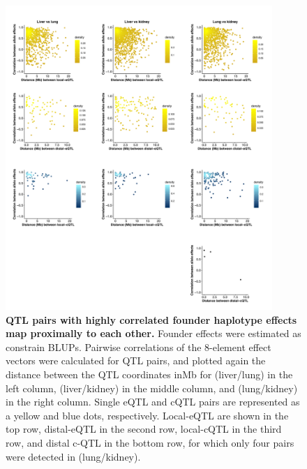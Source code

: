 \documentclass[9pt,twocolumn,twoside]{gsajnl}
\begin{document}
\begin{figure}[hp]
\renewcommand{\familydefault}{\sfdefault}\normalfont
\centering
\includegraphics[width=0.9\textwidth, trim={0in 0in 0in 0in}, clip]{figs/effect_size_cor_by_dist.pdf}
\caption{\textbf{QTL pairs with highly correlated founder haplotype effects map proximally to each other.} Founder effects were estimated as constrain BLUPs. Pairwise correlations of the 8-element effect vectors were calculated for QTL pairs, and plotted again the distance between the QTL coordinates inMb for (liver/lung) in the left column, (liver/kidney) in the middle column, and (lung/kidney) in the right column. Single eQTL and cQTL pairs are represented as a yellow and blue dots, respectively. Local-eQTL are shown in the top row, distal-eQTL in the second row, local-cQTL in the third row, and distal c-QTL in the bottom row, for which only four pairs were detected in (lung/kidney).
\label{fig:qtl_cor_by_distance_comparison}}
\end{figure}

\clearpage
\end{document}
